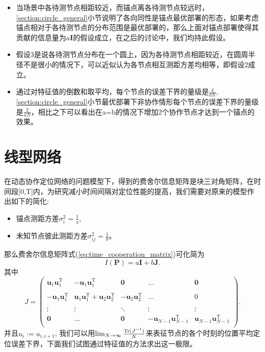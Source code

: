 \begin{remark}

\begin{itemize}
~\\
  \item 当场景中各待测节点相距较近，而锚点离各待测节点较远时，\ref{section:circle_general}小节说明了各向同性是锚点最优部署的形态，如果考虑锚点相对于各待测节点的分布范围是最优部署的，那么上面对锚点部署使得其贡献的信息量为$a\bm{I}$的假设成立，在之后的讨论中，我们均持此假设。
  \item 假设3是说各待测节点分布在一个圆上，因为各待测节点相距较近，在圆周半径不是很小的情况下，可以近似认为各节点相互测距方差均相等，即假设2成立。
  \item 通过对特征值的倒数和取平均，每个节点的误差下界的量级是$\frac{4}{bN}$,\ref{section:circle_general}小节最优部署下非协作情形每个节点的误差下界的量级是$\frac{2}{aN}$，相比之下可以看出在a=b的情况下增加2个协作节点才达到一个锚点的效果。
\end{itemize}

\end{remark}
\section{线型网络}\label{section:linear_network}
在动态协作定位网络的问题模型下，得到的费舍尔信息矩阵是块三对角矩阵，在时间段[0,T]内，为研究减小时间间隔对定位性能的提高，我们需要对原来的模型作出如下的简化:
\begin{itemize}
\item 锚点测距方差$\sigma_i^2=\frac{1}{a}$,
\item 未知节点彼此测距方差$\sigma^2_{ij}=\frac{1}{b}$。
\end{itemize}
那么费舍尔信息矩阵式(\ref{eq:time_cooperation_matrix})可化简为
\begin{equation}\label{eq:Pab}
I(\bm{P})=a\bm{I}+b\bm{J}.
\end{equation}
其中\begin{equation}
J=\left(
\begin{array}{ccccc}
\bm{u}_{1}\bm{u}_{1}^{\textrm{T}} &-\bm{u}_{1}\bm{u}_{1}^{\textrm{T}} &\bm{0}&\dots&\bm{0}\\
&&&&\\
-\bm{u}_{1}\bm{u}_{1}^{\textrm{T}} &\bm{u}_{1}\bm{u}_{1}^{\textrm{T}} +\bm{u}_{2}\bm{u}_{2}^{\textrm{T}} &-\bm{u}_{2}\bm{u}_{2}^{\textrm{T}} &\dots&0\\
&&&&\\
\vdots &\vdots&\ddots &\vdots&\vdots\\
\bm{0}&\dots&\bm{0}&-\bm{u}_{N-1}\bm{u}_{N-1}^{\textrm{T}} &\bm{u}_{N-1}\bm{u}_{N-1}^{\textrm{T}} \\
\end{array}
\right).
\end{equation}
并且$u_i:=u_{i,i+1}$,
我们可以用$\lim_{N\to \infty}\frac{\operatorname{Tr}(J^{-1})}{N}$来表征节点的各个时刻的位置平均定位误差下界，下面我们试图通过特征值的方法求出这一极限。



